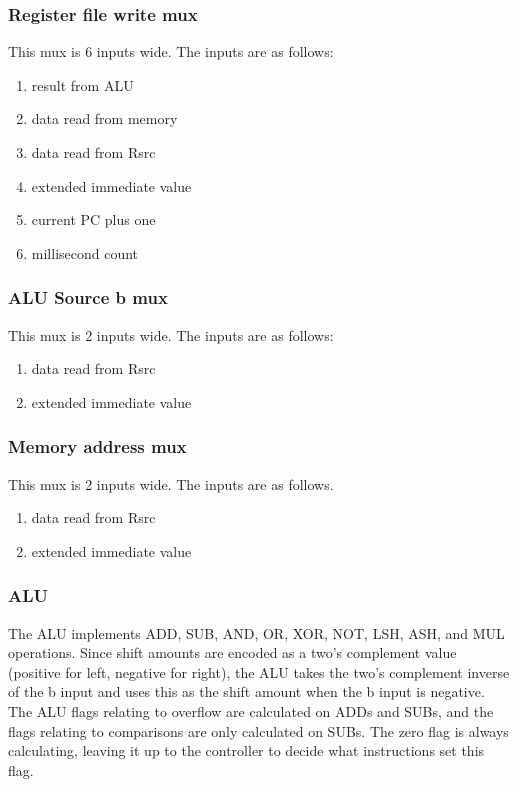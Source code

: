 \documentclass[10pt, portrait, letterpaper]{article}
\begin{document}
  \subsubsection{Register file write mux}
  This mux is 6 inputs wide. The inputs are as follows:
  \begin{enumerate} 
    \item result from ALU 
    \item data read from memory
    \item data read from Rsrc 
    \item extended immediate value
    \item current PC plus one 
    \item millisecond count
  \end{enumerate}

  \subsubsection{ALU Source b mux}
  This mux is 2 inputs wide. The inputs are as follows: 
  \begin{enumerate}
    \item data read from Rsrc 
    \item extended immediate value
  \end{enumerate}

  \subsubsection{Memory address mux} 
  This mux is 2 inputs wide. The inputs are as follows.
  \begin{enumerate} 
    \item data read from Rsrc
    \item extended immediate value
  \end{enumerate}

  \subsubsection{ALU}
  The ALU implements ADD, SUB, AND, OR, XOR, NOT, LSH, ASH, and MUL operations. Since shift amounts are encoded as a two's complement value (positive for left, negative for right), the ALU takes the two's complement inverse of the b input and uses this as the shift amount when the b input is negative. The ALU flags relating to overflow are calculated on ADDs and SUBs, and the flags relating to comparisons are only calculated on SUBs. The zero flag is always calculating, leaving it up to the controller to decide what instructions set this flag.
\end{document}
